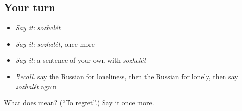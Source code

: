 \subsection*{Your turn}
\begin{itemize}
\raggedright
  \item \emph{Say it:} \emph{sozhalét}
  \item \emph{Say it:} \emph{sozhalét}, once more
  \item \emph{Say it:} a sentence of your own with \emph{sozhalét}
  \item \emph{Recall:} say the Russian for loneliness, then the Russian for lonely, then say \emph{sozhalét} again
\end{itemize}

\begin{tcolorbox}[breakable,colback=teal!4,colframe=teal!35!black,title={Before you move on}]
What does  mean? (\textquotedblleft{}To regret\textquotedblright{}.) Say it once more.
\end{tcolorbox}

